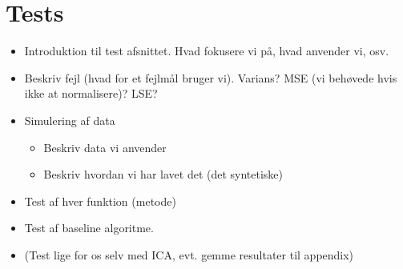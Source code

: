 \section{Tests}
    \begin{itemize}
        \item Introduktion til test afsnittet. Hvad fokusere vi på, hvad anvender vi, osv.
        \item Beskriv fejl (hvad for et fejlmål bruger vi). Varians? MSE (vi behøvede hvis ikke at normalisere)? LSE?
        \item Simulering af data
        \begin{itemize}
            \item Beskriv data vi anvender
            \item Beskriv hvordan vi har lavet det (det syntetiske)
        \end{itemize}
        \item Test af hver funktion (metode)
        \item Test af baseline algoritme.
        \item (Test lige for os selv med ICA, evt. gemme resultater til appendix)
    \end{itemize}